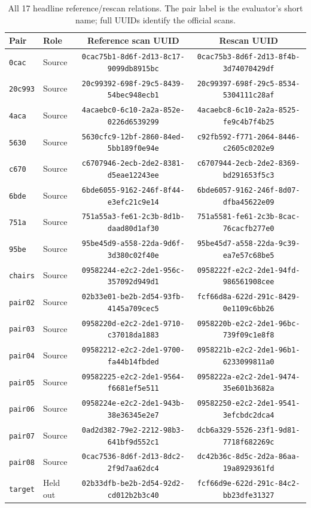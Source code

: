 \documentclass[10pt,twocolumn]{article}
\begin{document}
\begin{table}[t]
\centering
\scriptsize
\begin{tabular}{llcc}
\toprule
Pair & Role & Reference scan UUID & Rescan UUID \\
\midrule
\texttt{0cac} & Source & \texttt{0cac75b1-8d6f-2d13-8c17-9099db8915bc} & \texttt{0cac75b3-8d6f-2d13-8f4b-3d74070429df} \\
\texttt{20c993} & Source & \texttt{20c99392-698f-29c5-8439-54bec948ecb1} & \texttt{20c99397-698f-29c5-8534-5304111c28af} \\
\texttt{4aca} & Source & \texttt{4acaebc0-6c10-2a2a-852e-0226d6539299} & \texttt{4acaebc8-6c10-2a2a-8525-fe9c4b7f4b25} \\
\texttt{5630} & Source & \texttt{5630cfc9-12bf-2860-84ed-5bb189f0e94e} & \texttt{c92fb592-f771-2064-8446-c2605c0202e9} \\
\texttt{c670} & Source & \texttt{c6707946-2ecb-2de2-8381-d5eae12243ee} & \texttt{c6707944-2ecb-2de2-8369-bd291653f5c3} \\
\texttt{6bde} & Source & \texttt{6bde6055-9162-246f-8f44-e3efc21c9e14} & \texttt{6bde6057-9162-246f-8d07-dfba45622e09} \\
\texttt{751a} & Source & \texttt{751a55a3-fe61-2c3b-8d1b-daad80d1af30} & \texttt{751a5581-fe61-2c3b-8cac-76cacfb277e0} \\
\texttt{95be} & Source & \texttt{95be45d9-a558-22da-9d6f-3d380c02f40e} & \texttt{95be45d7-a558-22da-9c39-ea7e57c68be5} \\
\texttt{chairs} & Source & \texttt{09582244-e2c2-2de1-956c-357092d949d1} & \texttt{0958222f-e2c2-2de1-94fd-986561908cee} \\
\texttt{pair02} & Source & \texttt{02b33e01-be2b-2d54-93fb-4145a709cec5} & \texttt{fcf66d8a-622d-291c-8429-0e1109c6bb26} \\
\texttt{pair03} & Source & \texttt{0958220d-e2c2-2de1-9710-c37018da1883} & \texttt{0958220b-e2c2-2de1-96bc-739f09c1e8f8} \\
\texttt{pair04} & Source & \texttt{09582212-e2c2-2de1-9700-fa44b14fbded} & \texttt{0958221b-e2c2-2de1-96b1-6233099811a0} \\
\texttt{pair05} & Source & \texttt{09582225-e2c2-2de1-9564-f6681ef5e511} & \texttt{0958222a-e2c2-2de1-9474-35e601b3682a} \\
\texttt{pair06} & Source & \texttt{0958224e-e2c2-2de1-943b-38e36345e2e7} & \texttt{09582250-e2c2-2de1-9541-3efcbdc2dca4} \\
\texttt{pair07} & Source & \texttt{0ad2d382-79e2-2212-98b3-641bf9d552c1} & \texttt{dcb6a329-5526-23f1-9d81-7718f682269c} \\
\texttt{pair08} & Source & \texttt{0cac7536-8d6f-2d13-8dc2-2f9d7aa62dc4} & \texttt{dc42b36c-8d5c-2d2a-86aa-19a8929361fd} \\
\texttt{target} & Held out & \texttt{02b33dfb-be2b-2d54-92d2-cd012b2b3c40} & \texttt{fcf66d9e-622d-291c-84c2-bb23dfe31327} \\
\bottomrule
\end{tabular}
\caption{All 17 headline reference/rescan relations. The pair label is the
evaluator's short name; full UUIDs identify the official scans.}
\label{tab:relation-inclusion}
\end{table}
\end{document}
